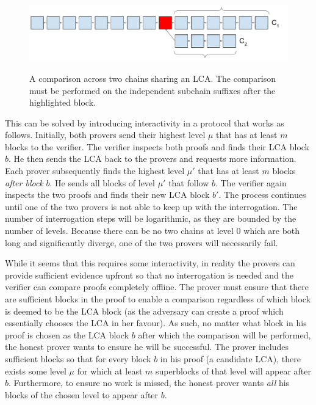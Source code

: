 \begin{figure}[ht]
    \caption{A comparison across two chains sharing an LCA. The comparison must
    be performed on the independent subchain suffixes after the highlighted block.}
    \centering
    \includegraphics[width=0.9\columnwidth,keepaspectratio]{chapters/introduction/figures/lca-comparison.pdf}
    \label{fig.lca-comparison}
\end{figure}

This can be solved by introducing interactivity in a protocol that works as
follows. Initially, both provers send their highest level $\mu$ that has at
least $m$ blocks to the verifier. The verifier inspects both proofs and finds
their LCA block $b$. He then sends the LCA back to the provers and requests more
information. Each prover subsequently finds the highest level $\mu'$ that has at
least $m$ blocks \emph{after block} $b$. He sends all blocks of level $\mu'$ that
follow $b$. The verifier again inspects the two
proofs and finds their new LCA block $b'$. The process continues until one of the
two provers is not able to keep up with the interrogation. The number of
interrogation steps will be logarithmic, as they are bounded by the number of
levels. Because there can be
no two chains at level $0$ which are both long and significantly diverge, one of
the two provers will necessarily fail.

While it seems that this requires some interactivity, in reality the provers can
provide sufficient evidence upfront so that no interrogation is needed and the verifier can compare proofs
completely
offline. The prover must ensure that there are sufficient blocks in the proof to
enable a comparison regardless of which block is deemed to be the LCA block (as
the adversary can create a proof which essentially chooses the LCA in her
favour). As such, no matter what block in his proof is chosen as the LCA block
$b$ after which the comparison will be performed, the honest prover wants to
ensure he will be successful. The prover includes sufficient blocks so that for
every block $b$ in his proof (a candidate LCA), there exists some level $\mu$
for which at least $m$ superblocks of that level will appear after $b$.
Furthermore, to ensure no work is missed, the honest prover wants \emph{all} his
blocks of the chosen level to appear after $b$.

